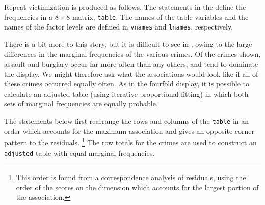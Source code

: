 \begin{Example}[victims]{Repeat victimization}
 is produced as follows.  The statements in the
 define the frequencies in a $8 \times 8$ matrix,
\texttt{table}.  The names of the table variables and the names of
the factor levels are defined in \texttt{vnames} and \texttt{lnames},
respectively.


There is a bit more to this story, but it is difficult to see in
, owing to the large differences in the marginal
frequencies of the various crimes.  Of the crimes shown, assault and
burglary occur far more often than any others, and tend to dominate the
display.
We might therefore ask what the associations would look like if all
of these crimes occurred equally often.
As in the fourfold display, it is possible to calculate an adjusted
table (using iterative proportional fitting)
in which both sets of marginal frequencies are equally probable.

The statements below first rearrange the rows and columns of the
\texttt{table} in an order which accounts for the maximum association
and gives an opposite-corner pattern to the residuals.%
\footnote{This order is found from a correspondence analysis of
residuals, using the order of the scores on the dimension which accounts
for the largest portion of the association.}
The row totals for the crimes are used to construct an \texttt{adjusted}
table with equal marginal frequencies.



\end{Example}
